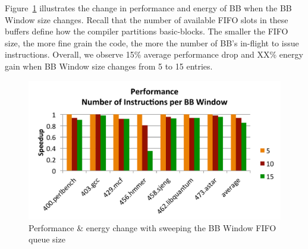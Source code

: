 Figure~\ref{fig:bbWin_size} illustrates the change in performance and energy of
BB when the BB Window size changes. Recall that the number of available FIFO
slots in these buffers define how the compiler partitions basic-blocks. The
smaller the FIFO size, the more fine grain the code, the more the number of BB's
in-flight to issue instructions. Overall, we observe 15\% average performance
drop and XX\% energy gain when BB Window size changes from 5 to 15 entries.
\begin{figure}[!htbp]
	\centering
	\includegraphics[width=1.0\columnwidth]{result/bbWin_size.pdf} 
    \caption{Performance \& energy change with sweeping the BB Window FIFO queue size}
	\label{fig:bbWin_size}
\end{figure}

